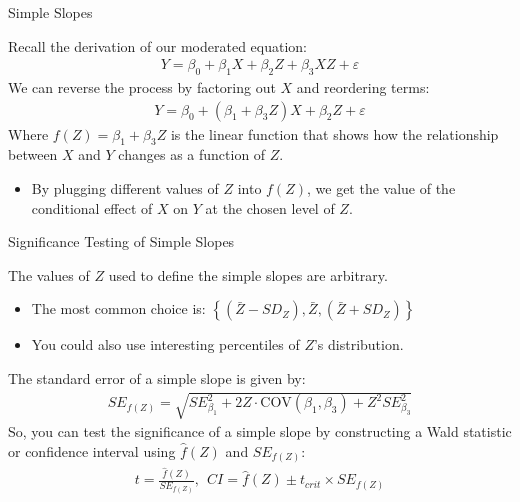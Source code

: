 \documentclass{beamer}\usepackage[]{graphicx}\usepackage[]{color}
\begin{document}
\begin{frame}{Simple Slopes}

  Recall the derivation of our moderated equation:
  \begin{align*}
    Y = \beta_0 + \beta_1X + \beta_2Z + \beta_3XZ + \varepsilon
  \end{align*}
  We can reverse the process by factoring out $X$ and reordering terms:
  \begin{align*}
    Y = \beta_0 + (\beta_1 + \beta_3Z)X + \beta_2Z + \varepsilon
  \end{align*}
  Where $f(Z) = \beta_1 + \beta_3Z$ is the linear function that shows how the 
  relationship between $X$ and $Y$ changes as a function of $Z$.\\
  \vc
  \begin{center}
  \end{center}
  \begin{itemize}
  \item By plugging different values of $Z$ into $f(Z)$, we get the value of the 
    conditional effect of $X$ on $Y$ at the chosen level of $Z$.
  \end{itemize}

\end{frame}


\begin{frame}{Significance Testing of Simple Slopes}

  The values of $Z$ used to define the simple slopes are arbitrary.
  \vc
  \begin{itemize}
  \item The most common choice is: $\left\{ (\bar{Z} - SD_Z), \bar{Z},
    (\bar{Z} + SD_Z) \right\}$
    \vc
  \item You could also use interesting percentiles of $Z$'s distribution.
  \end{itemize}
  \vb
  The standard error of a simple slope is given by:
  \begin{align*}
    SE_{f(Z)} = \sqrt{SE_{\beta_1}^2 + 2Z \cdot \text{COV}(\beta_1, \beta_3) + 
      Z^2 SE_{\beta_3}^2}
  \end{align*}
  So, you can test the significance of a simple slope by constructing a Wald 
  statistic or confidence interval using $\hat{f}(Z)$ and $SE_{f(Z)}$:
  \begin{align*}
    t = \frac{\hat{f}(Z)}{SE_{f(Z)}},~~
    CI = \hat{f}(Z) \pm t_{crit} \times SE_{f(Z)}
  \end{align*}

\end{frame}
\end{document}
